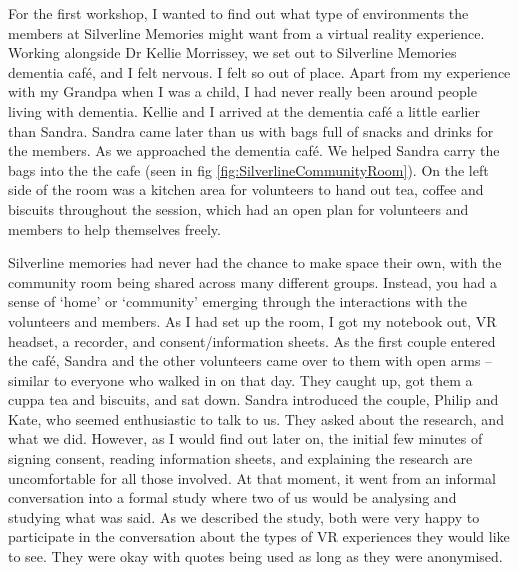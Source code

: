 For the first workshop, I wanted to find out what type of environments the members at Silverline Memories might want from a virtual reality experience. Working alongside Dr Kellie Morrissey, we set out to Silverline Memories dementia café, and I felt nervous. I felt so out of place. Apart from my experience with my Grandpa when I was a child, I had never really been around people living with dementia. Kellie and I arrived at the dementia café a little earlier than Sandra. Sandra came later than us with bags full of snacks and drinks for the members. As we approached the dementia café. We helped Sandra carry the bags into the the cafe (seen in fig \ref{fig:SilverlineCommunityRoom}). On the left side of the room was a kitchen area for volunteers to hand out tea, coffee and biscuits throughout the session, which had an open plan for volunteers and members to help themselves freely. 

Silverline memories had never had the chance to make space their own, with the community room being shared across many different groups. Instead, you had a sense of `home' or `community' emerging through the interactions with the volunteers and members. As I had set up the room, I got my notebook out, VR headset, a recorder, and consent/information sheets. As the first couple entered the café, Sandra and the other volunteers came over to them with open arms – similar to everyone who walked in on that day. They caught up, got them a cuppa tea and biscuits, and sat down. Sandra introduced the couple, Philip and Kate, who seemed enthusiastic to talk to us. They asked about the research, and what we did. However, as I would find out later on, the initial few minutes of signing consent, reading information sheets, and explaining the research are uncomfortable for all those involved. At that moment, it went from an informal conversation into a formal study where two of us would be analysing and studying what was said. As we described the study, both were very happy to participate in the conversation about the types of VR experiences they would like to see. They were okay with quotes being used as long as they were anonymised.

